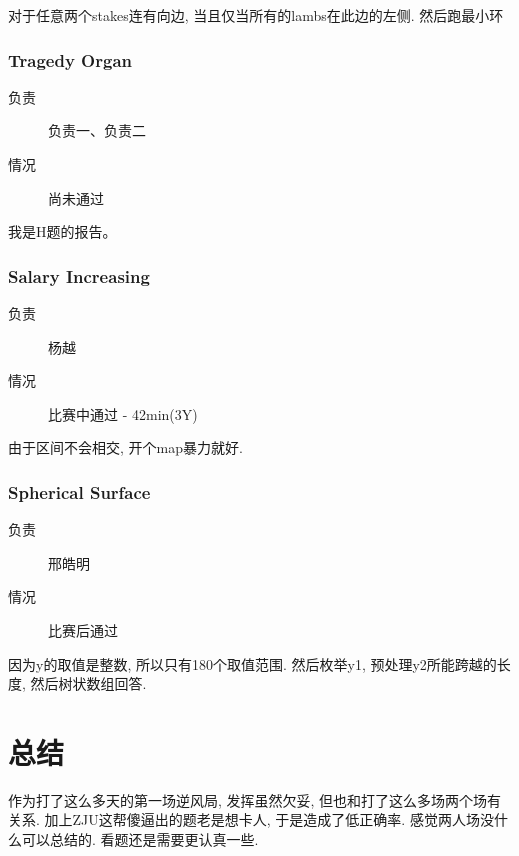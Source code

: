 \documentclass[a4paper, 11pt, nofonts, nocap, fancyhdr]{ctexart}
\newcommand{\problem}[1]{\subsubsection{#1}}
\begin{document}
对于任意两个stakes连有向边, 当且仅当所有的lambs在此边的左侧. 然后跑最小环

\problem{Tragedy Organ}

\begin{description}
\item[负责] 负责一、负责二
\item[情况] 尚未通过
\end{description}

我是H题的报告。

\problem{Salary Increasing}

\begin{description}
\item[负责] 杨越
\item[情况] 比赛中通过 - 42min(3Y)
\end{description}

由于区间不会相交, 开个map暴力就好.

\problem{Spherical Surface}

\begin{description}
\item[负责] 邢皓明
\item[情况] 比赛后通过
\end{description}

因为y的取值是整数, 所以只有180个取值范围. 然后枚举y1, 预处理y2所能跨越的长度, 然后树状数组回答.

\section{总结}

作为打了这么多天的第一场逆风局, 发挥虽然欠妥, 但也和打了这么多场两个场有关系. 加上ZJU这帮傻逼出的题老是想卡人, 于是造成了低正确率. 感觉两人场没什么可以总结的. 看题还是需要更认真一些.
\end{document}
